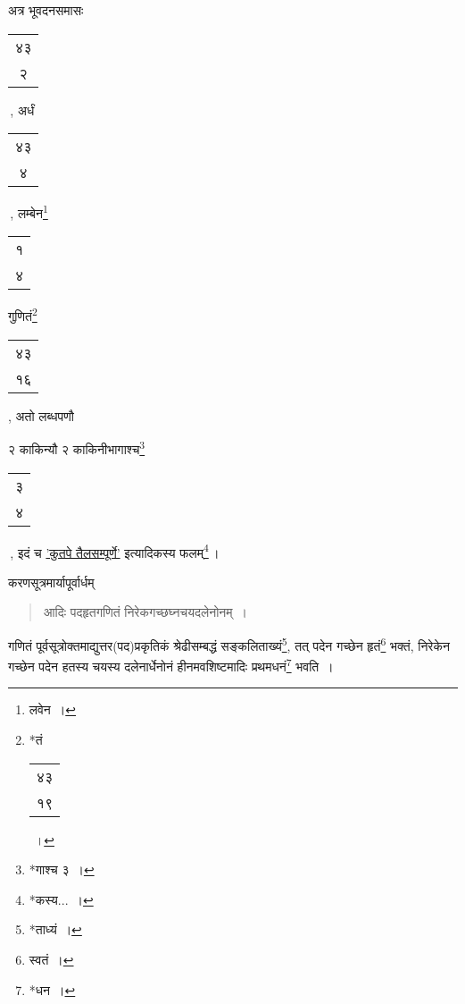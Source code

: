 \documentclass[10pt, openany]{book}
\begin{document}
{{{{{{अत्र भूवदनसमासः  \begin{tabular}{|c|} ४३\\ २\end{tabular}\,, अर्धं \begin{tabular}{|c|} ४३ \\४ \end{tabular}\,, लम्बेन\renewcommand{\thefootnote}{११}\footnote{लवेन~।} \begin{tabular}{|c|}१ \\४\end{tabular}
गुणितं\renewcommand{\thefootnote}{१२}\footnote{*तं \begin{tabular}{|c|} ४३\\ १९\end{tabular}~।} \begin{tabular}{|c|} ४३\\ १६\end{tabular} , अतो लब्धपणौ}
{२ काकिन्यौ २ काकिनीभागाश्च\renewcommand{\thefootnote}{१३}\footnote{*गाश्च ३~।} \begin{tabular}{c}३\\ ४\end{tabular}\,, इदं च \hyperref[e104]{'कुतपे तैलसम्पूर्णे'}
इत्यादिकस्य फलम्\renewcommand{\thefootnote}{१४}\footnote{*कस्य...~।}\,।}

\newpage

{करणसूत्रमार्यापूर्वार्धम्\textendash}

 \label{86.1}
\begin{quote}
{\bs आदिः पदहृतगणितं निरेकगच्छघ्नचयदलेनोनम्~।}\end{quote}

{गणितं पूर्वसूत्रोक्तमाद्युत्तर(पद)प्रकृतिकं श्रेढीसम्बद्धं
सङ्कलिताख्यं\renewcommand{\thefootnote}{१}\footnote{*ताध्यं~।}, तत् पदेन गच्छेन}
{हृतं\renewcommand{\thefootnote}{२}\footnote{स्वतं~।} भक्तं, निरेकेन गच्छेन पदेन हतस्य चयस्य दलेनार्धेनोनं
हीनमवशिष्टमादिः प्रथमधनं\renewcommand{\thefootnote}{३}\footnote{*धन~।} भवति~।}
\vspace{3mm}

}}}}}
\end{document}
